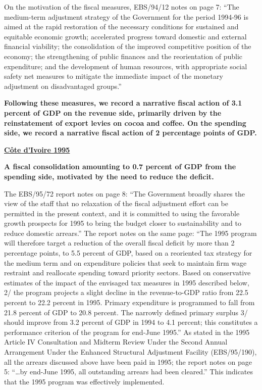 On the motivation of the fiscal measures, EBS/94/12 notes on page 7: “The medium-term adjustment strategy of the Government for the period 1994-96 is aimed at the rapid restoration of the necessary conditions for sustained and equitable economic growth; accelerated progress toward domestic and external financial viability; the consolidation of the improved competitive position of the economy; the strengthening of public finances and the reorientation of public expenditure; and the development of human resources, with appropriate social safety net measures to mitigate the immediate impact of the monetary adjustment on disadvantaged groups.”

\textbf{Following these measures, we record a narrative fiscal action of 3.1 percent of GDP on the revenue side, primarily driven by the reinstatement of export levies on cocoa and coffee. On the spending side, we record a narrative fiscal action of 2 percentage points of GDP.}

\textbf{\underline{Côte d'Ivoire 1995}}

\textbf{A fiscal consolidation amounting to 0.7 percent of GDP from the spending side, motivated by the need to reduce the deficit.}

The EBS/95/72 report notes on page 8: “The Government broadly shares the view of the staff that no relaxation of the fiscal adjustment effort can be permitted in the present context, and it is committed to using the favorable growth prospects for 1995 to bring the budget closer to sustainability and to reduce domestic arrears.” The report notes on the same page: “The 1995 program will therefore target a reduction of the overall fiscal deficit by more than 2 percentage points, to 5.5 percent of GDP, based on a reoriented tax strategy for the medium term and on expenditure policies that seek to maintain firm wage restraint and reallocate spending toward priority sectors. Based on conservative estimates of the impact of the envisaged tax measures in 1995 described below, 2/ the program projects a slight decline in the revenue-to-GDP ratio from 22.5 percent to 22.2 percent in 1995. Primary expenditure is programmed to fall from 21.8 percent of GDP to 20.8 percent. The narrowly defined primary surplus 3/ should improve from 3.2 percent of GDP in 1994 to 4.1 percent; this constitutes a performance criterion of the program for end-June 1995.” As stated in the 1995 Article IV Consultation and Midterm Review Under the Second Annual Arrangement Under the Enhanced Structural Adjustment Facility (EBS/95/190), all the arrears discussed above have been paid in 1995; the report notes on page 5: “…by end-June 1995, all outstanding arrears had been cleared.” This indicates that the 1995 program was effectively implemented.

